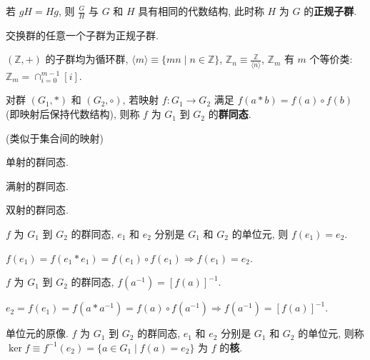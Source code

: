 \documentclass{note}
\begin{document}
\begin{thm}[正规子群]
    若 $gH=Hg$, 则 $\frac{G}{H}$ 与 $G$ 和 $H$ 具有相同的代数结构, 此时称 $H$ 为 $G$ 的\textbf{正规子群}.
\end{thm}

\begin{thm}
    交换群的任意一个子群为正规子群.
\end{thm}

\begin{eg}
    $(\mathbb{Z},+)$ 的子群均为循环群, $\langle m\rangle\equiv\{mn\mid n\in\mathbb{Z}\}$, $\mathbb{Z}_n\equiv\frac{\mathbb{Z}}{\langle n\rangle}$, $\mathbb{Z}_m$ 有 $m$ 个等价类: $\mathbb{Z}_m=\cap_{i=0}^{m-1}[i]$.
\end{eg}

\begin{df}[群同态]
    对群 $(G_1,*)$ 和 $(G_2,\circ)$, 若映射 $f:G_1\rightarrow G_2$ 满足 $f(a*b)=f(a)\circ f(b)$ (即映射后保持代数结构), 则称 $f$ 为 $G_1$ 到 $G_2$ 的\textbf{群同态}.
\end{df}
(类似于集合间的映射)

\begin{df}[单同态]
    单射的群同态.
\end{df}

\begin{df}[满同态]
    满射的群同态.
\end{df}

\begin{df}[同构]
    双射的群同态.
\end{df}

\begin{thm}
    $f$ 为 $G_1$ 到 $G_2$ 的群同态, $e_1$ 和 $e_2$ 分别是 $G_1$ 和 $G_2$ 的单位元, 则 $f(e_1)=e_2$.
\end{thm}
\begin{pf}
    $f(e_1)=f(e_1*e_1)=f(e_1)\circ f(e_1)\Longrightarrow f(e_1)=e_2$.
\end{pf}

\begin{thm}
    $f$ 为 $G_1$ 到 $G_2$ 的群同态, $f(a^{-1})=[f(a)]^{-1}$.
\end{thm}
\begin{pf}
    $e_2=f(e_1)=f(a*a^{-1})=f(a)\circ f(a^{-1})\Longrightarrow f(a^{-1})=[f(a)]^{-1}$.
\end{pf}

\begin{df}
    单位元的原像. $f$ 为 $G_1$ 到 $G_2$ 的群同态, $e_1$ 和 $e_2$ 分别是 $G_1$ 和 $G_2$ 的单位元, 则称 $\ker f\equiv f^{-1}(e_2)=\{a\in G_1\mid f(a)=e_2\}$ 为 $f$ 的\textbf{核}.
\end{df}
\end{document}
